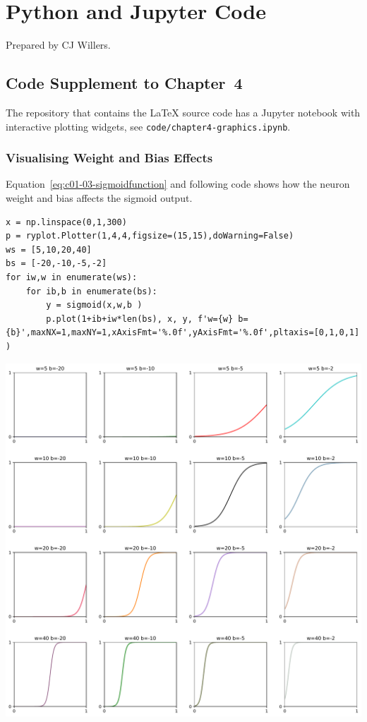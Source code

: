 
\chapter{Python and Jupyter Code}
\label{sec:PythonandJupyterCode}

Prepared by CJ Willers.


\section{Code Supplement to Chapter~4}
\label{sec:CodeSupplementtoChapter4}



The repository that contains the \LaTeX{} source code has a Jupyter notebook with interactive plotting widgets, see \lstinline{code/chapter4-graphics.ipynb}.

\subsection{Visualising Weight and Bias Effects}
\label{sec:VisualisingWeightandBiasEffects}

Equation~\ref{eq:c01-03-sigmoidfunction} and following code shows how the neuron weight and bias affects the sigmoid output.

\begin{lstlisting}
x = np.linspace(0,1,300)
p = ryplot.Plotter(1,4,4,figsize=(15,15),doWarning=False)
ws = [5,10,20,40]
bs = [-20,-10,-5,-2]
for iw,w in enumerate(ws):
    for ib,b in enumerate(bs):
        y = sigmoid(x,w,b )
        p.plot(1+ib+iw*len(bs), x, y, f'w={w} b={b}',maxNX=1,maxNY=1,xAxisFmt='%.0f',yAxisFmt='%.0f',pltaxis=[0,1,0,1] )
\end{lstlisting}

{\centering \includegraphics[width=\textwidth,]{pic/sigmoid4x4plot} \par}

